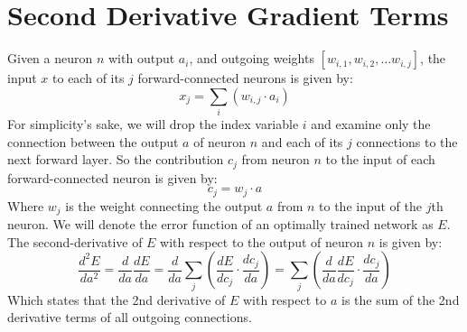 \section{Second Derivative Gradient Terms}
Given a neuron $n$ with output $a_i$, and outgoing weights $\left[ w_{i,1}, w_{i,2}, \ldots w_{i,j} \right]$, the input $x$ to each of its $j$ forward-connected neurons is given by:
\begin{equation}
x_j = \sum_i\left(w_{i,j} \cdot a_i\right)
\end{equation}
For simplicity's sake, we will drop the index variable $i$ and examine only the connection between the output $a$ of neuron $n$ and each of its $j$ connections to the next forward layer. So the contribution $c_j$ from neuron $n$ to the input of each forward-connected neuron is given by:
\begin{equation}
c_j = w_j \cdot a
\end{equation} 
Where $w_j$ is the weight connecting the output $a$ from $n$ to the input of the $j$th neuron. We will denote the error function of an optimally trained network as $E$. The second-derivative of $E$ with respect to the output of neuron $n$ is given by: 
\begin{equation}
\frac{d^2E}{da^2} = \frac{d}{da}\frac{dE}{da} = \frac{d}{da}\sum_j\left(\frac{dE}{dc_j}\cdot\frac{dc_j}{da}\right) = \sum_j\left(\frac{d}{da}\frac{dE}{dc_j}\cdot\frac{dc_j}{da}\right)
\end{equation}
Which states that the 2nd derivative of $E$ with respect to $a$ is the sum of the 2nd derivative terms of all outgoing connections.  